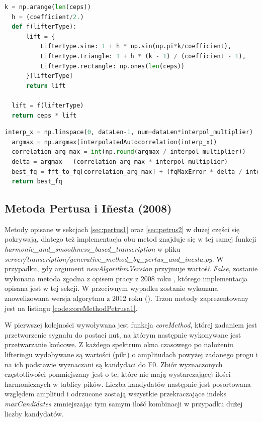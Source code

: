 \documentclass[12pt,a4paper,twoside]{mwart}
\begin{document}
\begin{lstlisting}[float, language=Python, caption={Filtrowanie w domenie quefrency}, captionpos=b, label={code:liftering}]
  k = np.arange(len(ceps))
  h = (coefficient/2.)
  def f(lifterType):
      lift = {
          LifterType.sine: 1 + h * np.sin(np.pi*k/coefficient),
          LifterType.triangle: 1 + h * (k - 1) / (coefficient - 1),
          LifterType.rectangle: np.ones(len(ceps))
      }[lifterType]
      return lift

  lift = f(lifterType)
  return ceps * lift
\end{lstlisting}

\begin{lstlisting}[float, language=Python, caption={Wyznaczanie F0 w ACLOS}, captionpos=b, label={code:bestFqInterpolate}]
  interp_x = np.linspace(0, dataLen-1, num=dataLen*interpol_multiplier)
  argmax = np.argmax(interpolatedAutocorrelation(interp_x))
  correlation_arg_max = int(np.round(argmax / interpol_multiplier))
  delta = argmax - (correlation_arg_max * interpol_multiplier)
  best_fq = fft_to_fq[correlation_arg_max] + (fqMaxError * delta / interpol_multiplier)
  return best_fq
\end{lstlisting}

\subsection{Metoda Pertusa i Iñesta (2008)}\label{sec:impl:alg:specSmoothnes}
Metody opisane w sekcjach \ref{sec:pertus1} oraz \ref{sec:petrus2} w dużej części się pokrywają, dlatego też implementacja obu metod znajduje się w tej samej funkcji \textit{harmonic\_and\_smoothness\_based\_transcription} w pliku \textit{server/transcription/generative\_method\_by\_pertus\_and\_inesta.py}. W przypadku, gdy argument \textit{newAlgorithmVersion} przyjmuje wartość \textit{False}, zostanie wykonana metoda zgodna z opisem pracy z 2008 roku \cite{Transcription:Pertus:Inharmonicity}, którego implementacja opisana jest w tej sekcji. W przeciwnym wypadku zostanie wykonana znowelizowana wersja algorytmu z 2012 roku (\cite{Transcription:Pertus:Inharmonicity2}). Trzon metody zaprezentowany jest na listingu \ref{code:coreMethodPetrusa1}.

W pierwszej kolejności wywoływana jest funkcja \textit{coreMethod}, której zadaniem jest przetworzenie sygnału do postaci nut, na którym następnie wykonywane jest przetwarzanie końcowe. Z każdego spektrum okna czasowego po nałożeniu lifteringu wydobywane są wartości (piki) o amplitudach powyżej zadanego progu i na ich podstawie wyznaczani są kandydaci do F0. Zbiór wyznaczonych częstotliwości pomniejszany jest o te, które nie mają wystarczającej ilości harmonicznych w tablicy pików. Liczba kandydatów następnie jest posortowana względem amplitud i odrzucone zostają wszystkie przekraczające indeks \textit{maxCandidates} zmniejszając tym samym ilość kombinacji w przypadku dużej liczby kandydatów.
\end{document}
